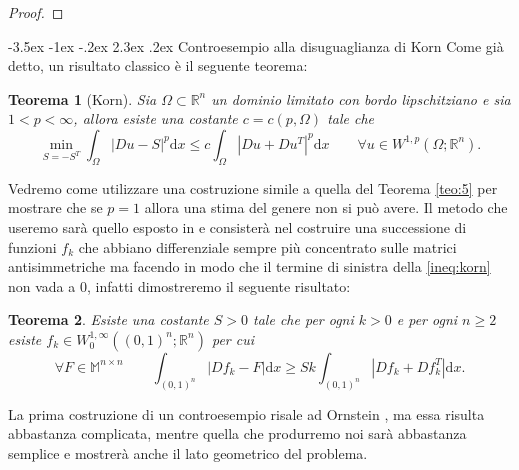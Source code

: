 \documentclass[a4paper,11pt]{book}
\makeatletter
\theoremstyle{plain}
\newtheorem{teo}{Teorema}[chapter]
\theoremstyle{definition}
\theoremstyle{remark}
\newcommand{\R}{\mathbb{R}}
\newcommand{\M}{\mathbb{M}}
\newcommand{\LL}{\mathscr{L}}
\newcommand{\dx}{\text{d}x}
\DeclareMathOperator{\Id}{Id}
\renewcommand\section{\@startsection {section}{1}{\z@}%
                                   {-3.5ex \@plus -1ex \@minus -.2ex}%
                                   {2.3ex \@plus.2ex}%
                                   {\normalfont\Large\bfseries}}
\makeatother
\begin{document}
\begin{proof}
\end{proof}
\section{Controesempio alla disuguaglianza di Korn}
Come già detto, un risultato classico è il seguente teorema:
\begin{teo}[Korn]\label{teo:korn}
	Sia $\Omega\subset \R^n$ un dominio limitato con bordo lipschitziano e sia $1<p<\infty$, allora esiste una costante $c=c(p,\Omega)$ tale che
	\begin{equation}\label{ineq:korn}
		\min_{S=-S^T} \int_{\Omega}|Du-S|^p\dx\leq c\int_{\Omega}\left|Du+Du^T \right|^p\dx\qquad\forall u\in W^{1,p}(\Omega;\R^n).
	\end{equation}

\end{teo}
Vedremo come utilizzare una costruzione simile a quella del Teorema \ref{teo:5} per mostrare che se $p=1$ allora una stima del genere non si può avere. Il metodo che useremo sarà quello esposto in \cite{conti} e consisterà nel costruire una successione di funzioni $f_k$ che abbiano differenziale sempre più concentrato sulle matrici antisimmetriche ma facendo in modo che il termine di sinistra della \eqref{ineq:korn} non vada a $0$, infatti dimostreremo il seguente risultato:

\begin{comment}
È noto che, vedendo $SO(n)$ come sottovarietà di $\M^{n\times n}$,  $T_{\Id}SO(n)$ sono le matrici antisimmetriche e che $N_{\Id}SO(n)$ sono le matrici simmetriche, quindi prima di studiare il problema originale vediamo il caso più semplice, in cui cerchiamo di trovare una disuguaglianza che coinvolde la distanza dal tangente nell'identità (che è un spazio affine immerso in $\M^{n\times n}$ e quindi più semplice da trattare rispetto a $SO(n)$ che è una sottovarietà):
\end{comment}
\begin{teo}\label{teo:6}
	Esiste una costante $S>0$ tale che per ogni $k > 0$ e per ogni $n\geq 2$ esiste $f_k\in W_0^{1,\infty}((0,1)^n;\R^n)$ per cui
	\begin{equation}\label{eq:10}
		\forall F\in \M^{n\times n}\qquad\int_{(0,1)^n}|Df_k-F|\dx\geq Sk\int_{(0,1)^n}|Df_k+Df_k^T|\dx.
	\end{equation}
\end{teo}
La prima costruzione di un controesempio risale ad Ornstein \cite{ornstein}, ma essa risulta abbastanza complicata, mentre quella che produrremo noi sarà abbastanza semplice e mostrerà anche il lato geometrico del problema.
\end{document}
